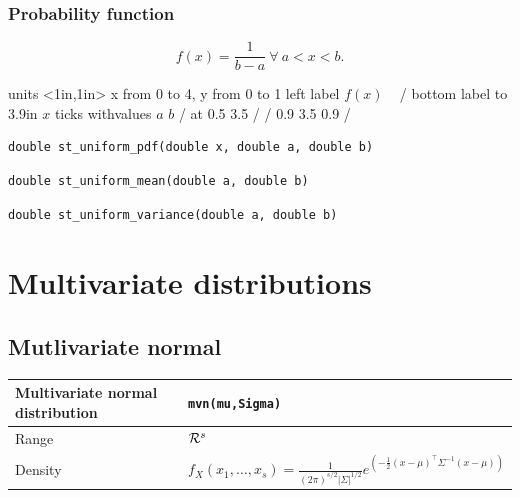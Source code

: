 \subsubsection{Probability function}

\[
  f(x) = \frac{1}{b-a} \ \forall\ a < x < b.
\]

\begin{center}
\beginpicture
\setcoordinatesystem units <1in,1in>
\setplotarea x from 0 to 4, y from 0 to 1
\axis left
  label {$f(x)$ \ } /
\axis bottom
  label {\hbox to 3.9in {\hfill $x$}} 
  ticks withvalues $a$  $b$ / at 0.5  3.5 / /
\setlinear
{}    0.9   3.5   0.9 /
\endpicture
\end{center}

\begin{verbatim}
double st_uniform_pdf(double x, double a, double b)
\end{verbatim}

\begin{verbatim}
double st_uniform_mean(double a, double b)
\end{verbatim}

\begin{verbatim}
double st_uniform_variance(double a, double b)
\end{verbatim}

\section{Multivariate distributions}

\subsection{Mutlivariate normal}
\label{sec:st_mvn}

\begin{table}[htb]
\begin{tabularx}{\textwidth}{lX}
Multivariate normal distribution & \verb|mvn(mu,Sigma)| \\
\hline
Range & $\mathcal{R}^s$ \\
Density &
$f_X(x_1, \dots, x_s)=\frac {1} {(2\pi)^{s/2} \left|\Sigma\right|^{1/2}}
e^{\left( -\frac{1}{2}( x - \mu)^\top \Sigma^{-1} (x - \mu)\right)}$ \\
\hline
\end{tabularx}
\end{table}

